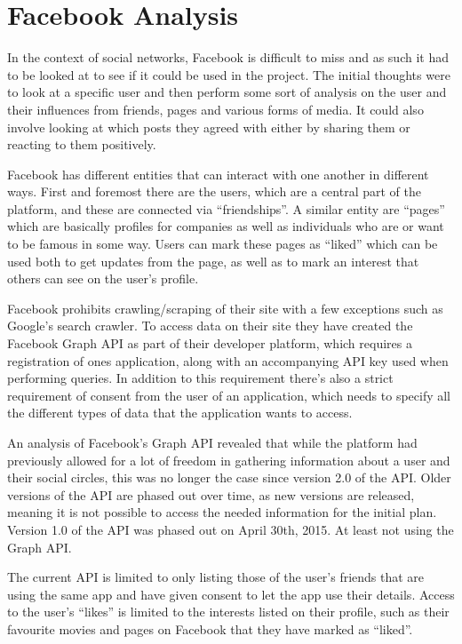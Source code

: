 \chapter{Facebook Analysis}\label{chap:facebook-analysis}
In the context of social networks, Facebook is difficult to miss
\citep{FacebookPopularity} and as such it had to be looked at to see if it could be used in the project.
The initial thoughts were to look at a specific user and then perform some sort of analysis on the user and their
influences from friends, pages and various forms of media.
It could also involve looking at which posts they agreed with either by sharing them or reacting to them positively.\nl

Facebook has different entities that can interact with one another in different ways.
First and foremost there are the users, which are a central part of the platform, and these are connected via
``friendships''.
A similar entity are ``pages'' which are basically profiles for companies as well as individuals who are or want to be
famous in some way.
Users can mark these pages as ``liked'' which can be used both to get updates from the page, as well as to mark an
interest that others can see on the user's profile.\nl

Facebook prohibits crawling/scraping of their site with a few exceptions such as Google's search crawler.
To access data on their site they have created the Facebook Graph API as part of their developer platform, which
requires a registration of ones application, along with an accompanying API key used when performing queries.
In addition to this requirement there's also a strict requirement of consent from the user of an application, which
needs to specify all the different types of data that the application wants to access.\nl

An analysis of Facebook's Graph API revealed that while the platform had previously allowed for a lot of freedom in
gathering information about a user and their social circles, this was no longer the case since version 2.0 of the API.
Older versions of the API are phased out over time, as new versions are released, meaning it is not possible to access
the needed information for the initial plan.
Version 1.0 of the API was phased out on April 30th, 2015.
At least not using the Graph API.\nl

The current API is limited to only listing those of the user's friends that are using the same app and have given
consent to let the app use their details.
Access to the user's ``likes'' is limited to the interests listed on their profile, such as their favourite movies and
pages on Facebook that they have marked as ``liked''.\nl

